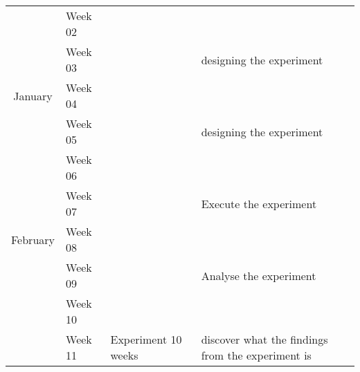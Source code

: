 \documentclass[a4paper,10pt,titlepage]{report}
\begin{document}
\begin{tabular}{clll}
                                & Week 02      &                                             &                                                                                                                            \\
                                & Week 03      &                                             & \multirow{-2}{*}{designing the experiment}                                                                                 \\
\multirow{-4}{*}{January}       & Week 04      &                                             &                                                                                                                            \\
                                & Week 05      &                                             & \multirow{-2}{*}{designing the experiment}                                                                                 \\
                                & Week 06      &                                             &                                                                                                                            \\
                                & Week 07      &                                             & \multirow{-2}{*}{Execute the experiment}                                                                                   \\
\multirow{-4}{*}{February}      & Week 08      &                                             &                                                                                                                            \\
                                & Week 09      &                                             & \multirow{-2}{*}{Analyse the experiment}                                                                                   \\
                                & Week 10      &                                             &                                                                                                                            \\
                                & Week 11      &  \multirow{-10}{*}{Experiment 10 weeks}     & \multirow{-2}{*}{discover what the findings from the experiment is}                                                         \\

\end{tabular}
\end{document}
